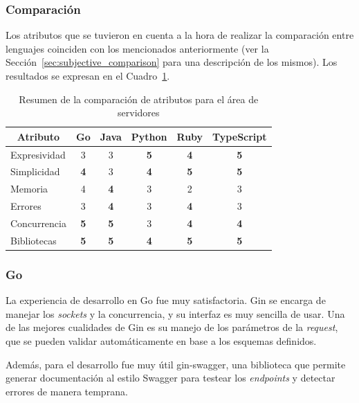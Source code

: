 \documentclass[11pt]{article}
\let\Oldsubsubsection\subsubsection
\renewcommand{\subsubsection}{\FloatBarrier\Oldsubsubsection}
\newcommand{\badMetric}[1]{{\color{BrickRed}#1}}
\newcommand{\goodMetric}[1]{{\textbf{#1}}}
\newcommand{\english}[1]{\textit{#1}}
\begin{document}
\subsubsection{Comparación}

Los atributos que se tuvieron en cuenta a la hora de realizar la comparación entre lenguajes coinciden con los mencionados anteriormente (ver la Sección~\ref{sec:subjective_comparison} para una descripción de los mismos). Los resultados se expresan en el Cuadro~\ref{tab:http:experiences}.

\begin{table}[h]
\centering
\begin{tabular}{|l|c|c|c|c|c|}
\hline
\multicolumn{1}{|c|}{Atributo} & Go & Java & Python & Ruby & TypeScript \\ \hline
Expresividad & 3 & 3 & \goodMetric{5} & \goodMetric{4} & \goodMetric{5} \\ \hline
Simplicidad & \goodMetric{4} & 3 & \goodMetric{4} & \goodMetric{5} & \goodMetric{5} \\ \hline
Memoria & 4 & \goodMetric{4} & 3 & \badMetric{2} & 3\\ \hline
Errores & 3 & \goodMetric{4} & 3 & \goodMetric{4} & 3 \\ \hline
Concurrencia & \goodMetric{5} & \goodMetric{5} & 3 & \goodMetric{4} & \goodMetric{4} \\ \hline
Bibliotecas & \goodMetric{5} & \goodMetric{5} & \goodMetric{4} & \goodMetric{5} & \goodMetric{5} \\ \hline
\end{tabular}
\caption{Resumen de la comparación de atributos para el área de servidores}
\label{tab:http:experiences}
\end{table}

\subsubsection{Go}

La experiencia de desarrollo en Go fue muy satisfactoria. Gin se encarga de manejar los \english{sockets} y la concurrencia, y su interfaz es muy sencilla de usar. Una de las mejores cualidades de Gin es su manejo de los parámetros de la \english{request}, que se pueden validar automáticamente en base a los esquemas definidos.

Además, para el desarrollo fue muy útil gin-swagger, una biblioteca que permite generar documentación al estilo Swagger para testear los \english{endpoints} y detectar errores de manera temprana.
\end{document}
